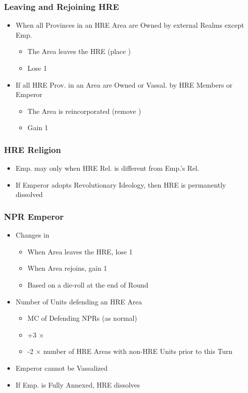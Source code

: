\documentclass[10pt]{article}
\begin{document}
\subsubsection*{Leaving and Rejoining HRE }
\begin{itemize}
	\item When all Provinces in an HRE Area are Owned by external Realms except Emp.
	\begin{itemize}
		\item The Area leaves the HRE (place \nothre)
		\item Lose 1\authority
	\end{itemize}
	\item If all HRE Prov. in an Area are Owned or Vassal. by HRE Members or Emperor
	\begin{itemize}
		\item The Area is reincorporated (remove \nothre)
		\item Gain 1\authority
	\end{itemize}
\end{itemize}

\subsubsection*{HRE Religion }
\begin{itemize}
	\item Emp. may  only when HRE Rel. is different from Emp.'s Rel.
	\item If Emperor adopts Revolutionary Ideology, then HRE is permanently dissolved
\end{itemize}

\subsubsection*{NPR Emperor }
\begin{itemize}
	\item Changes in \authority
	\begin{itemize}
		\item When Area leaves the HRE, lose 1\authority
		\item When Area rejoins, gain 1\authority
		\item Based on a die-roll at the end of Round
	\end{itemize}
	\item Number of Units defending an HRE Area
	\begin{itemize}
		\item MC of Defending NPRs (as normal)
		\item +3 × \authority
		\item -2 × number of HRE Areas with non-HRE Units prior to this Turn
	\end{itemize}
	\item Emperor cannot be Vassalized
	\item If Emp. is Fully Annexed, HRE dissolves
\end{itemize}
\end{document}
